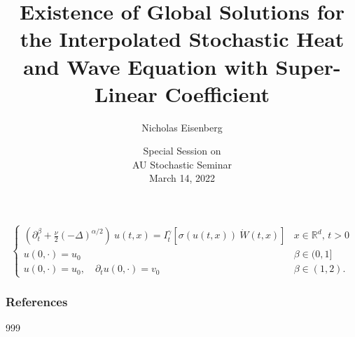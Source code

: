 \documentclass{beamer}%
\title[About Beamer] %
{Existence of Global Solutions for the Interpolated Stochastic Heat and Wave Equation with Super-Linear Coefficient}
\author[Arthur, Doe] %
{Nicholas Eisenberg}
\institute[Auburn University]
{
	\vspace{.1em}
}
\date[VLC 2021] %
{ \small Special Session on \\
	{AU Stochastic Seminar \\[0.5em]
	March 14, 2022\\[1em]}
}
\numberwithin{equation}{section}
\newcommand{\R}{\mathbb{R}}
\begin{document}
	
	
	\frame{\titlepage}
	
	\setcounter{page}{1}

\begin{frame}
	\begin{equation}
	\label{E:SPDE}
	\begin{cases}
	\left(\partial^\beta_t + \frac{\nu}{2}(-\Delta)^{\alpha/2}\right)\: u(t,x) = I^\gamma_t \left[\sigma( u(t,x)) \: \dot W(t,x) \right] & \text{$x\in \R^d$, $t>0$} \\
	u(0,\cdot) = u_0                                                                                                            & \beta \in (0,1]               \\
	u(0,\cdot) = u_0, \quad \partial_t u(0,\cdot) = v_0                                                                            & \beta \in (1,2).
	\end{cases}
	\end{equation}
\end{frame}
	
	\begin{frame}
		\frametitle{References}
		\small
		
		\begin{thebibliography}{999}
		\end{thebibliography}
	
	\end{frame}
	
	
\end{document}
